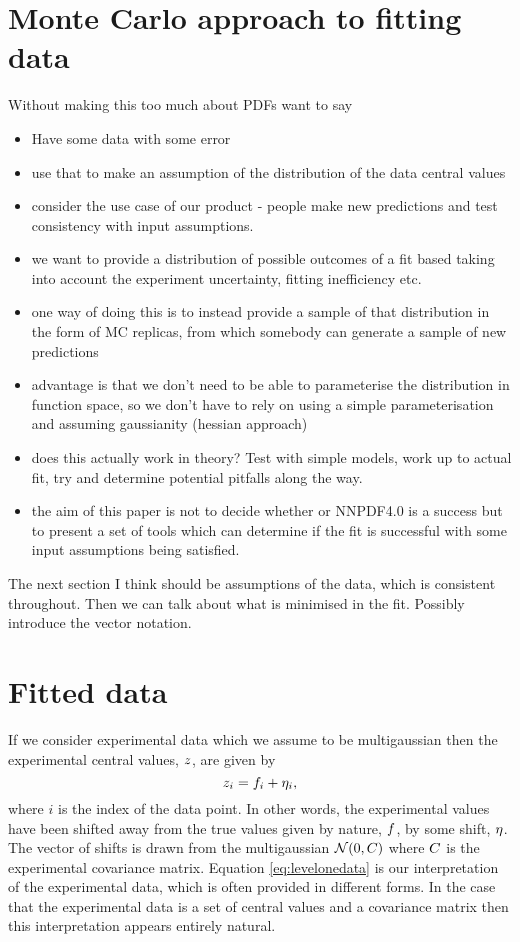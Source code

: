 \section{Monte Carlo approach to fitting data}
Without making this too much about PDFs want to say
\begin{itemize}
    \item Have some data with some error
    \item use that to make an assumption of the distribution of the data central values
    \item consider the use case of our product - people make new predictions and
    test consistency with input assumptions.
    \item we want to provide a distribution of possible outcomes of a fit based
    taking into account the experiment uncertainty, fitting inefficiency etc.
    \item one way of doing this is to instead provide a sample of that
    distribution in the form of MC replicas, from which somebody can generate
    a sample of new predictions
    \item advantage is that we don't need to be able to parameterise the
    distribution in function space, so we don't have to rely on using a simple
    parameterisation and assuming gaussianity (hessian approach)
    \item does this actually work in theory? Test with simple models, work up
    to actual fit, try and determine potential pitfalls along the way.
    \item the aim of this paper is not to decide whether or NNPDF4.0 is a success
    but to present a set of tools which can determine if the fit is successful
    with some input assumptions being satisfied.
\end{itemize}
The next section I think should be assumptions of the data, which is consistent
throughout. Then we can talk about what is minimised in the fit. Possibly
introduce the vector notation.

\section{Fitted data}
If we consider experimental data which we assume
to be multigaussian then the experimental central values, $z$, are given by
\begin{equation}\label{eq:levelonedata}
    z_{i} = f_i + \eta_i,
\end{equation}
where $i$ is the index of the data point.
In other words, the experimental values have been shifted away from the true
values given by nature, $f$, by some shift, $\eta$. The vector of shifts
is drawn from
the multigaussian $\mathcal{N}(0, C)$ where $C$ is the experimental
covariance matrix. Equation \eqref{eq:levelonedata} is our interpretation of the
experimental data, which is often provided in different forms. In the case that
the experimental data is a set of central values and a covariance matrix then
this interpretation appears entirely natural.

